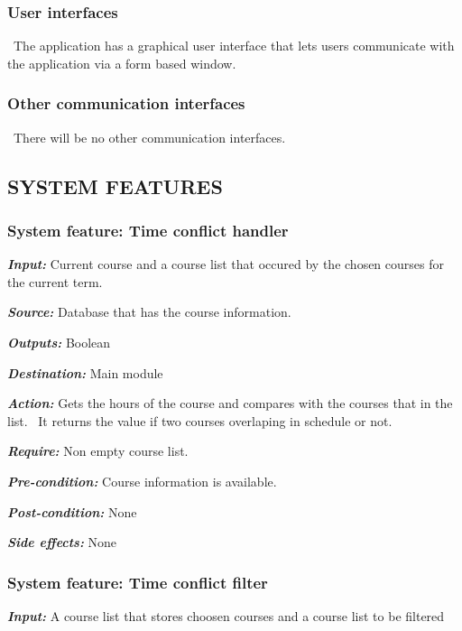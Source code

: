\documentclass[twoside,letterpaper]{article}
\newcommand{\featuresection}[1] {
\subsubsection[System feature: #1]{\selectlanguage{english}\rmfamily\bfseries\color{black} System feature: #1}
}
\begin{document}
\subsubsection[User
interfaces]{\rmfamily\bfseries\color{black}
User interfaces}
{\color{black}
\foreignlanguage{english}{\ }\foreignlanguage{english}{The application has a graphical user interface that lets users communicate with the application via a form based window.}

\subsubsection[Other communication
interfaces]{\rmfamily\bfseries\color{black}
Other communication interfaces}
{\color{black}
\foreignlanguage{english}{\ }\foreignlanguage{english}{There will be no other communication interfaces.}}

\subsection[SYSTEM
FEATURES]{\rmfamily\bfseries\color{black}
SYSTEM FEATURES}


\featuresection{Time conflict handler}

\emph{\textbf{Input:}}  Current course and a course list that occured by the chosen courses for the current term.

\emph{\textbf{Source:}} Database that has the course information.

\emph{\textbf{Outputs:}} Boolean

\emph{\textbf{Destination:}} Main module

\emph{\textbf{Action:}} Gets the hours of the course and compares with the courses that in the list. \ It returns the value if two courses overlaping in schedule or not.

\emph{\textbf{Require:}} Non empty course list.

\emph{\textbf{Pre-condition: }} Course information is available.

\emph{\textbf{Post-condition: }} None

\emph{\textbf{Side effects:}} None



\featuresection{Time conflict filter}

\emph{\textbf{Input:}}  A course list that stores choosen courses and a course list to be filtered

}
\end{document}
